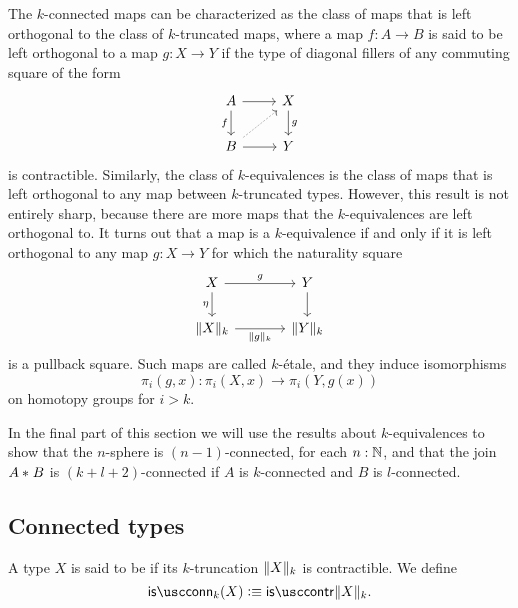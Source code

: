 The $k$-connected maps can be characterized as the class of maps that is left orthogonal to the class of $k$-truncated maps, where a map $f:A\to B$ is said to be left orthogonal to a map $g:X\to Y$ if the type of diagonal fillers of any commuting square of the form
\begin{equation*}
  \begin{tikzcd}
    A \arrow[d,swap,"f"] \arrow[r] & X \arrow[d,"g"] \\
    B \arrow[r] \arrow[ur,densely dotted] & Y
  \end{tikzcd}
\end{equation*}
is contractible. Similarly, the class of $k$-equivalences is the class of maps that is left orthogonal to any map between $k$-truncated types. However, this result is not entirely sharp, because there are more maps that the $k$-equivalences are left orthogonal to. It turns out that a map is a $k$-equivalence if and only if it is left orthogonal to any map $g:X\to Y$ for which the naturality square
\begin{equation*}
  \begin{tikzcd}[column sep=large]
    X \arrow[r,"g"] \arrow[d,swap,"\eta"] & Y \arrow[d] \\
    \trunc{k}{X} \arrow[r,swap,"\trunc{k}{g}"] & \trunc{k}{Y}
  \end{tikzcd}
\end{equation*}
is a pullback square. Such maps are called $k$-\'etale, and they induce isomorphisms
\begin{equation*}
  \pi_i(g,x):\pi_i(X,x)\to\pi_i(Y,g(x))
\end{equation*}
on homotopy groups for $i>k$.

In the final part of this section we will use the results about $k$-equivalences to show that the $n$-sphere is $(n-1)$-connected, for each $n:\N$, and that the join $\join{A}{B}$ is $(k+l+2)$-connected if $A$ is $k$-connected and $B$ is $l$-connected.

\subsection{Connected types}

\begin{defn}
  A type $X$ is said to be  if its $k$-truncation $\trunc{k}{X}$ is contractible. We define
  \begin{equation*}
    \isconn_k(X)\defeq\iscontr\trunc{k}{X}.
  \end{equation*}
\end{defn}

